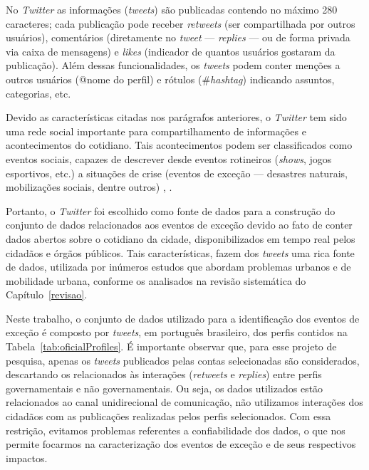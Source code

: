 \documentclass[
	12pt,				%
	oneside,			%
	a4paper,			%
	english,			%
	brazil				%
	]{abntex2ppgsi}
\begin{document}
{{{%

No \textit{Twitter} as informações (\textit{tweets}) são publicadas contendo no máximo 280 caracteres; cada publicação pode receber \textit{retweets} (ser compartilhada por outros usuários), comentários (diretamente no \textit{tweet} --- \textit{replies} ---  ou de forma privada via caixa de mensagens) e \textit{likes} (indicador de quantos usuários gostaram da publicação). Além dessas funcionalidades, os \textit{tweets} podem conter menções a outros usuários (@nome do perfil) e rótulos (\#\textit{hashtag}) indicando assuntos, categorias, etc.

Devido as características citadas nos parágrafos anteriores, o \textit{Twitter} tem sido uma rede social importante para compartilhamento de informações e acontecimentos do cotidiano. Tais acontecimentos podem ser classificados como eventos sociais, capazes de descrever desde eventos rotineiros (\textit{shows}, jogos esportivos, etc.) a situações de crise (eventos de exceção --- desastres naturais, mobilizações sociais, dentre outros) \cite{zhou2014event}, \cite{atefeh2015survey}.
 
Portanto, o \textit{Twitter} foi escolhido como fonte de dados para a construção do conjunto de dados relacionados aos eventos de exceção devido ao fato de conter dados abertos sobre o cotidiano da cidade, disponibilizados em tempo real pelos cidadãos e órgãos públicos. Tais características, fazem dos \textit{tweets} uma rica fonte de dados, utilizada por inúmeros estudos que abordam problemas urbanos e de mobilidade urbana, conforme os analisados na revisão sistemática do Capítulo~\ref{revisao}.

Neste trabalho, o conjunto de dados utilizado para a identificação dos eventos de exceção é composto por \textit{tweets}, em português brasileiro, dos perfis contidos na Tabela~\ref{tab:oficialProfiles}. É importante observar que, para esse projeto de pesquisa, apenas os \textit{tweets} publicados pelas contas selecionadas são considerados, descartando os relacionados às interações (\textit{retweets} e \textit{replies}) entre perfis governamentais e não governamentais. Ou seja, os dados utilizados estão relacionados ao canal unidirecional de comunicação, não utilizamos interações dos cidadãos com as publicações realizadas pelos perfis selecionados. Com essa restrição, evitamos problemas referentes a confiabilidade dos dados, o que nos permite focarmos na caracterização dos eventos de exceção e de seus respectivos impactos.

}}}
\end{document}
